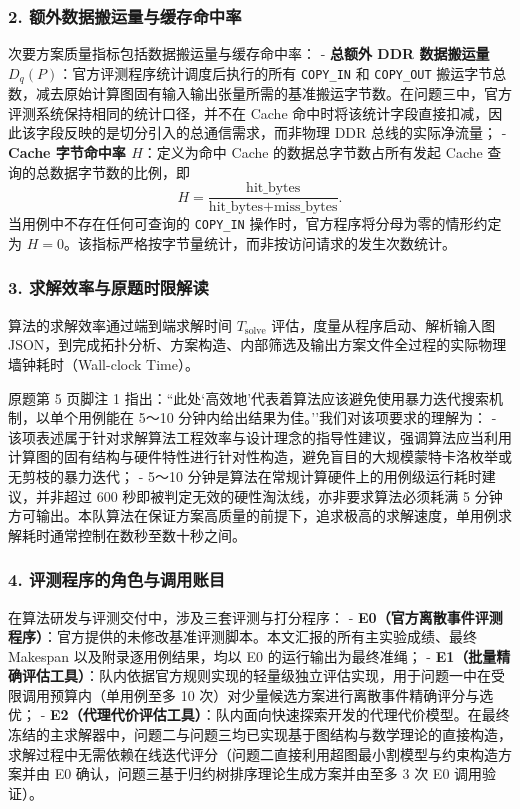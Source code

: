 \documentclass[anonymous,notoc]{gmcm2026}
\begin{document}
\subsubsection{2. 额外数据搬运量与缓存命中率}

次要方案质量指标包括数据搬运量与缓存命中率： - \textbf{总额外 DDR 数据搬运量 \(D_q(P)\)}：官方评测程序统计调度后执行的所有 \texttt{COPY\_IN} 和 \texttt{COPY\_OUT} 搬运字节总数，减去原始计算图固有输入输出张量所需的基准搬运字节数。在问题三中，官方评测系统保持相同的统计口径，并不在 Cache 命中时将该统计字段直接扣减，因此该字段反映的是切分引入的总通信需求，而非物理 DDR 总线的实际净流量； - \textbf{Cache 字节命中率 \(H\)}：定义为命中 Cache 的数据总字节数占所有发起 Cache 查询的总数据字节数的比例，即 \[H = \frac{\text{hit\_bytes}}{\text{hit\_bytes} + \text{miss\_bytes}}.\] 当用例中不存在任何可查询的 \texttt{COPY\_IN} 操作时，官方程序将分母为零的情形约定为 \(H = 0\)。该指标严格按字节量统计，而非按访问请求的发生次数统计。

\subsubsection{3. 求解效率与原题时限解读}

算法的求解效率通过端到端求解时间 \(T_{\text{solve}}\) 评估，度量从程序启动、解析输入图 JSON，到完成拓扑分析、方案构造、内部筛选及输出方案文件全过程的实际物理墙钟耗时（Wall-clock Time）。

原题第 5 页脚注 1 指出：``此处`高效地'代表着算法应该避免使用暴力迭代搜索机制，以单个用例能在 5～10 分钟内给出结果为佳。''我们对该项要求的理解为： - 该项表述属于针对求解算法工程效率与设计理念的指导性建议，强调算法应当利用计算图的固有结构与硬件特性进行针对性构造，避免盲目的大规模蒙特卡洛枚举或无剪枝的暴力迭代； - 5～10 分钟是算法在常规计算硬件上的用例级运行耗时建议，并非超过 600 秒即被判定无效的硬性淘汰线，亦非要求算法必须耗满 5 分钟方可输出。本队算法在保证方案高质量的前提下，追求极高的求解速度，单用例求解耗时通常控制在数秒至数十秒之间。

\subsubsection{4. 评测程序的角色与调用账目}

在算法研发与评测交付中，涉及三套评测与打分程序： - \textbf{E0（官方离散事件评测程序）}：官方提供的未修改基准评测脚本。本文汇报的所有主实验成绩、最终 Makespan 以及附录逐用例结果，均以 E0 的运行输出为最终准绳； - \textbf{E1（批量精确评估工具）}：队内依据官方规则实现的轻量级独立评估实现，用于问题一中在受限调用预算内（单用例至多 10 次）对少量候选方案进行离散事件精确评分与选优； - \textbf{E2（代理代价评估工具）}：队内面向快速探索开发的代理代价模型。在最终冻结的主求解器中，问题二与问题三均已实现基于图结构与数学理论的直接构造，求解过程中无需依赖在线迭代评分（问题二直接利用超图最小割模型与约束构造方案并由 E0 确认，问题三基于归约树排序理论生成方案并由至多 3 次 E0 调用验证）。
\end{document}
